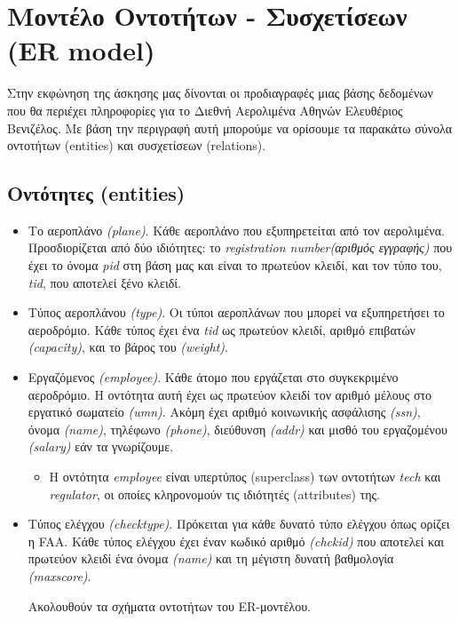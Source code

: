 \documentclass[a4paper]{article}
\begin{document}

\newcommand{\tab}{\hspace*{3em}}

\section{Μοντέλο Οντοτήτων - Συσχετίσεων (ER model)}
Στην εκφώνηση της άσκησης μας δίνονται οι προδιαγραφές μιας βάσης δεδομένων που θα περιέχει
πληροφορίες για το Διεθνή Αερολιμένα Αθηνών Ελευθέριος Βενιζέλος. Με βάση την
περιγραφή αυτή μπορούμε να ορίσουμε τα παρακάτω σύνολα οντοτήτων (entities)
και συσχετίσεων (relations).

\subsection{Οντότητες (entities)}
\begin{itemize}
\item Το αεροπλάνο \emph{(plane)}. Κάθε αεροπλάνο που εξυπηρετείται από τον αερολιμένα.
Προσδιορίζεται από δύο ιδιότητες: το \emph{registration number(αριθμός
εγγραφής)} που έχει το όνομα \emph{pid} στη βάση μας και είναι το πρωτεύον
κλειδί, και τον τύπο του, \emph{tid}, που αποτελεί ξένο κλειδί.
\item Τύπος αεροπλάνου \emph{(type)}. Οι τύποι αεροπλάνων που μπορεί να εξυπηρετήσει το
αεροδρόμιο. Κάθε τύπος έχει ένα \emph{tid} ως πρωτεύον κλειδί, αριθμό επιβατών
\emph{(capacity)}, και το βάρος του \emph{(weight)}.
\item Εργαζόμενος \emph{(employee)}. Κάθε άτομο που εργάζεται στο συγκεκριμένο αεροδρόμιο. Η
οντότητα αυτή έχει ως πρωτεύον κλειδί τον αριθμό μέλους στο εργατικό
σωματείο \emph{(umn)}. Ακόμη έχει αριθμό κοινωνικής ασφάλισης
\emph{(ssn)}, όνομα \emph{(name)}, τηλέφωνο \emph{(phone)},
διεύθυνση \emph{(addr)} και μισθό του εργαζομένου \emph{(salary)} εάν τα γνωρίζουμε.
\begin{itemize}
\item Η οντότητα \emph{employee} είναι υπερτύπος (superclass) των οντοτήτων
\emph{tech} και \emph{regulator}, οι οποίες κληρονομούν τις ιδιότητές
(attributes) της.
\end{itemize}
\item Τύπος ελέγχου \emph{(checktype)}. Πρόκειται για κάθε δυνατό τύπο ελέγχου όπως
ορίζει η FAA. Κάθε τύπος ελέγχου έχει έναν κωδικό αριθμό \emph{(chckid)} που
αποτελεί και πρωτεύον κλειδί ένα όνομα \emph{(name)} και τη μέγιστη δυνατή
βαθμολογία \emph{(maxscore)}.

\pagebreak
Ακολουθούν τα σχήματα οντοτήτων του ER-μοντέλου.
\end{itemize}
\end{document}
